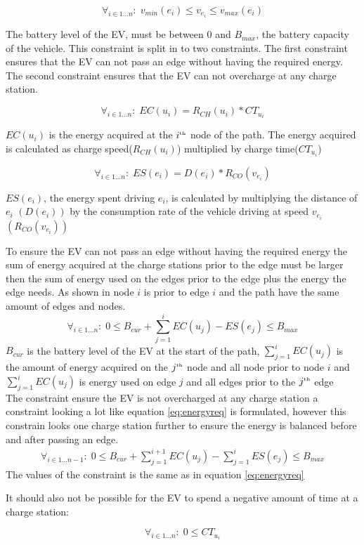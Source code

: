 \begin{equation}
\forall_{i\in1 \dots n }:\;v_{min}(e_i) \leq v_{e_i} \leq v_{max}(e_i)  
\end{equation}

The battery level of the EV, must be between $0$ and $B_{max}$, the battery capacity of the vehicle. 
This constraint is split in to two constraints. The first constraint ensures that the EV can not pass an edge without having the required energy. The second constraint ensures that the EV can not overcharge at any charge station. 

\begin{equation}
\forall_{i\in1 \dots n }:\; EC(u_i) = R_{CH}(u_i) * CT_{u_i}
\end{equation}

$EC(u_i)$ is the energy acquired at the $i^{\text{\tiny th}}$ node of the path. The energy acquired is calculated as charge speed($R_{CH}(u_i)$) multiplied by charge time($CT_{u_i}$) 

\begin{equation}
\forall_{i\in1 \dots n }:\; ES(e_i) = D(e_i)*R_{CO}(v_{e_i})
\end{equation} 

$ES(e_i)$, the energy spent driving $e_i$, is calculated by multiplying the distance of $e_i$ $(D(e_i))$ by  the consumption rate of the vehicle driving at speed $v_{e_i}$ $(R_{CO}(v_{e_i}))$

To ensure the EV can not pass an edge without having the required energy the sum of energy acquired at the charge stations prior to the edge must be larger then the sum of energy used on the edges prior to the edge plus the energy the edge needs. As shown in  node $i$ is prior to edge $i$ and the path have the same amount of edges and nodes. 
\begin{equation}
\forall_{i\in1 \dots n }:\;0 \leq B_{cur} + \sum_{j=1}^{i} EC(u_j) - ES(e_j) \leq B_{max} 
\end{equation}\label{eq:energyreq}
$B_{cur}$ is the battery level of the EV at the start of the path, $ \sum_{j=1}^{i} EC(u_j)$ is the amount of energy acquired on the $j^{\text{\tiny th}}$ node and all node prior to node $i$ and $\sum_{j=1}^{i} EC(u_j)$ is energy used on edge $j$ and all edges prior to the $j^{\text{\tiny th}}$ edge \\

The constraint ensure the EV is not overcharged at any charge station a constraint looking a lot like equation \ref{eq:energyreq} is formulated, however this constrain looks one charge station further to ensure the energy is balanced before and after passing an edge. 
\begin{equation}
\begin{aligned}
\forall_{i\in1 \dots n-1}:\;0 \leq B_{cur} + \sum_{j=1}^{i+1} EC(u_j) - \sum_{j=1}^{i} ES(e_j) \leq B_{max} 
\end{aligned}
\end{equation}
The values of the constraint is the same as in equation \ref{eq:energyreq}

It should also not be possible for the EV to spend a negative amount of time at a charge station:

\begin{equation}
\forall_{i\in1 \dots n }:\; 0 \leq CT_{u_i} 
\end{equation}


